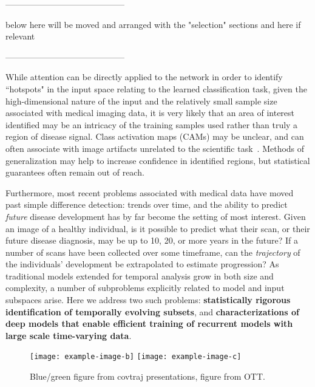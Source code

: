 
------------------------------------------

below here will be moved and arranged with the "selection" sections and here if relevant

------------------------------------------

While attention can be directly applied to the network in order to identify ``hotspots" in the input space relating to the learned classification task, 
given the high-dimensional nature of the input
and the relatively small sample size 
associated with medical imaging data, 
it is very likely that an area of interest identified
may be an intricacy of the training samples used rather than truly a region of disease signal.
Class activation maps (CAMs) may be unclear, and can often associate with image artifacts unrelated to the scientific task~\citep{adebayo2018sanity}.
Methods of generalization may help to increase confidence in identified regions, but statistical guarantees often remain out of reach.

Furthermore, most recent problems associated with medical data have moved past simple difference detection: trends over time, and the ability to predict {\em future} disease development has by far become the setting of most interest.
Given an image of a healthy individual, is it possible to predict what their scan, or their future disease diagnosis, may be up to 10, 20, or more years in the future?
If a number of scans have been collected over some timeframe, can the \textit{trajectory} of the individuals' development be extrapolated to estimate progression?
As traditional models extended for temporal analysis grow in both size and complexity,
a number of subproblems explicitly related to model and input subspaces arise. Here we address two such problems: \textbf{statistically rigorous identification of temporally evolving subsets}, and \textbf{characterizations of deep models that enable efficient training of recurrent models with large scale time-varying data}.

\begin{figure}
    \centering
    \texttt{[image: example-image-b]}
    \texttt{[image: example-image-c]}
    \caption[Selecting feature subsets]{\color{red} Blue/green figure from covtraj presentations, figure from OTT.}
\end{figure}

